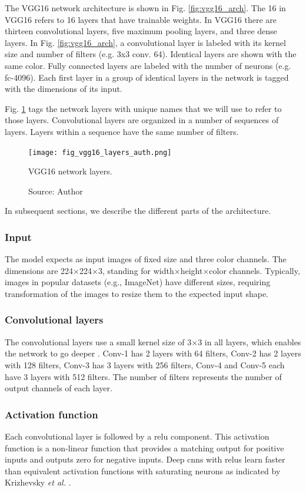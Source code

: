 The VGG16 network architecture is shown in Fig. \ref{fig:vgg16_arch}. The 16 in VGG16 refers to 16 layers that have trainable weights. In VGG16 there are thirteen convolutional layers, five maximum pooling layers, and three dense layers. In Fig. \ref{fig:vgg16_arch}, a convolutional layer is labeled with its kernel size and number of filters  (e.g. 3x3 conv. 64). Identical layers are shown with the same color. Fully connected layers are labeled with the number of neurons (e.g. fc-4096). Each first layer in a group of identical layers in the network is tagged with the dimensions of its input. 

Fig. \ref{fig:vgg16_layers_auth} tags the network layers with unique names that we will use to refer to those layers. Convolutional layers are organized in a number of sequences of layers. Layers within a sequence have the same number of filters.
\begin{figure}[ht]
    \begin{center}       
    \texttt{[image: fig\_vgg16\_layers\_auth.png]}
    \caption[VGG16 network layers]{VGG16 network layers.}
    \caption*{Source: Author}
    \label{fig:vgg16_layers_auth}
    \end{center}
\end{figure}

In subsequent sections, we describe the different parts of the architecture.
\subsubsection{Input}
The model expects as input images of fixed size and three color channels. The dimensions are 224$\times$224$\times$3, standing for width$\times$height$\times$color channels. Typically, images in popular datasets (e.g., ImageNet) have different sizes, requiring transformation of the images to resize them to the expected input shape.

\subsubsection{Convolutional layers}
The convolutional layers use a small kernel size of 3$\times$3 in all layers, which enables the network to go deeper \cite{simonyan2014very}. Conv-1 has 2 layers with 64 filters, Conv-2 has 2 layers with 128 filters, Conv-3 has 3 layers with 256 filters, Conv-4 and Conv-5 each have 3 layers with 512 filters. The number of filters represents the number of output channels of each layer.

\subsubsection{Activation function}
Each convolutional layer is followed by a \acrfull{relu} component. This activation function is a non-linear function that provides a matching output for positive inputs and outputs zero for negative inputs. Deep \acrshort{cnn}s with \acrshort{relu}s learn faster than equivalent activation functions with saturating neurons as indicated by Krizhevsky \textit{et al.} \cite{krizhevsky2017imagenet}.

